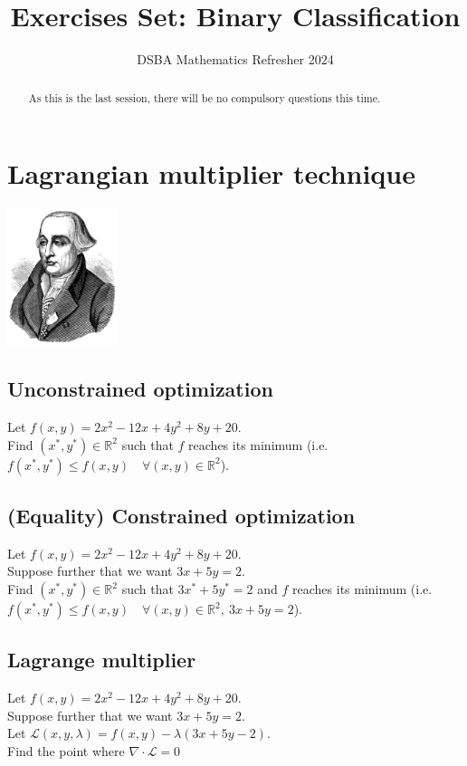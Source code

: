 \documentclass[]{article}
\title{Exercises Set: Binary Classification}
\author{DSBA Mathematics Refresher 2024}
\date{}
\newcommand{\R}{\mathbb{R}}
\begin{document}
	
	\maketitle
	
	\begin{abstract}
		As this is the last session, there will be no compulsory questions this time.
	\end{abstract}	
	
	\section{Lagrangian multiplier technique}
	\begin{center}
		\includegraphics[height=4cm]{Lagrange}
	\end{center}
	
	\subsection{Unconstrained optimization}
	Let $f(x,y) = 2x^2-12x + 4y^2 + 8y + 20$.\\
	Find $(x^*,y^*) \in \R^2$ such that $f$ reaches its minimum (i.e. $f(x^*,y^*) \leq f(x,y) \quad \forall (x,y) \in \R^2$).
	
	\subsection{(Equality) Constrained optimization}
	Let $f(x,y) = 2x^2-12x + 4y^2 + 8y + 20$.\\
	Suppose further that we want $3x + 5y = 2$.\\
	Find $(x^*,y^*) \in \R^2$ such that $3x^* + 5y^* = 2$ and $f$ reaches its minimum (i.e. $f(x^*,y^*) \leq f(x,y) \quad \forall (x,y) \in \R^2,\ 3x + 5y = 2$).
	
	\subsection{Lagrange multiplier}
	Let $f(x,y) = 2x^2-12x + 4y^2 + 8y + 20$.\\
	Suppose further that we want $3x + 5y = 2$.\\
	Let $\mathcal{L}(x,y,\lambda) = f(x,y) - \lambda (3x +5y - 2)$.\\
	Find the point where $\nabla \cdot \mathcal{L} = 0$
	
\end{document}
